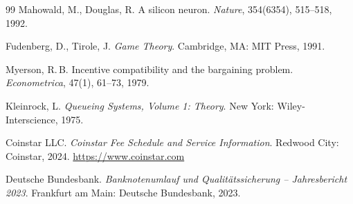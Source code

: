 ﻿\documentclass[a4paper,12pt]{article}
\theoremstyle{definition}
\begin{document}
\begin{thebibliography}{99}
  Mahowald, M., Douglas, R.
  A silicon neuron.
  \emph{Nature}, 354(6354), 515--518, 1992.

  Fudenberg, D., Tirole, J.
  \emph{Game Theory}.
  Cambridge, MA: MIT Press, 1991.

  Myerson, R.\,B.
  Incentive compatibility and the bargaining problem.
  \emph{Econometrica}, 47(1), 61--73, 1979.

  Kleinrock, L.
  \emph{Queueing Systems, Volume 1: Theory}.
  New York: Wiley-Interscience, 1975.

  Coinstar LLC.
  \emph{Coinstar Fee Schedule and Service Information}.
  Redwood City: Coinstar, 2024.
  \url{https://www.coinstar.com}

  Deutsche Bundesbank.
  \emph{Banknotenumlauf und Qualitätssicherung -- Jahresbericht 2023}.
  Frankfurt am Main: Deutsche Bundesbank, 2023.

\end{thebibliography}
\end{document}
